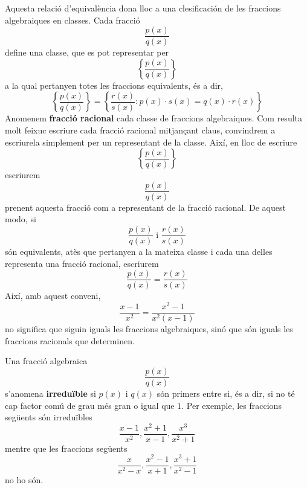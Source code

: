 Aquesta relació d'equivalència dona lloc a una clesificación de les
fraccions algebraiques en classes. Cada fracció
\begin{equation*}
\frac{p(x)}{q(x)}
\end{equation*}define una classe, que es pot representar per\begin{equation*}
\left\{ \frac{p(x)}{q(x)}\right\}
\end{equation*}a la qual pertanyen totes les fraccions equivalents, és a dir,\begin{equation*}
\left\{ \frac{p(x)}{q(x)}\right\} =\left\{ \frac{r(x)}{s(x)}:p(x)\cdot
s(x)=q(x)\cdot r(x)\right\}
\end{equation*}Anomenem \textbf{fracció racional} cada classe de fraccions
algebraiques. Com resulta molt feixuc escriure cada fracció racional
mitjançant claus, convindrem a escriurela simplement per un representant
de la classe. Així, en lloc de escriure\begin{equation*}
\left\{ \frac{p(x)}{q(x)}\right\}
\end{equation*}escriurem\begin{equation*}
\frac{p(x)}{q(x)}
\end{equation*}prenent aquesta fracció com a representant de la fracció racional. De
aquest modo, si\begin{equation*}
\frac{p(x)}{q(x)}\text{ \ \ \ i \ \ \ }\frac{r(x)}{s(x)}
\end{equation*}són equivalents, atès que pertanyen a la mateixa classe i cada una delles
representa una fracció racional, escriurem\begin{equation*}
\frac{p(x)}{q(x)}=\frac{r(x)}{s(x)}
\end{equation*}Així, amb aquest conveni,
\begin{equation*}
\frac{x-1}{x^{2}}=\frac{x^{2}-1}{x^{2}(x-1)}
\end{equation*}no significa que siguin iguals les fraccions algebraiques, sinó que són
iguals les fraccions racionals que determinen.

Una fracció algebraica
\begin{equation*}
\frac{p(x)}{q(x)}
\end{equation*}s’anomena \textbf{irreduïble} si $p(x)$ i $q(x)$ són primers entre si,
és a dir, si no té cap factor comú de grau més gran o igual
que $1$. Per exemple, les fraccions següents són irreduïbles\begin{equation*}
\frac{x-1}{x^{2}},\frac{x^{2}+1}{x-1},\frac{x^{3}}{x^{2}+1}
\end{equation*}mentre que les fraccions següents\begin{equation*}
\frac{x}{x^{2}-x},\frac{x^{2}-1}{x+1},\frac{x^{3}+1}{x^{2}-1}
\end{equation*}no ho són.

